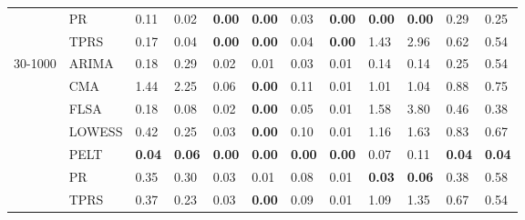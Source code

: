 \begin{table}[ht]
\begin{tabular}{llllllllllll}
   & PR & 0.11 & 0.02 & \textbf{0.00} & \textbf{0.00} & 0.03 & \textbf{0.00} & \textbf{0.00} & \textbf{0.00} & 0.29 & 0.25 \\ 
   & TPRS & 0.17 & 0.04 & \textbf{0.00} & \textbf{0.00} & 0.04 & \textbf{0.00} & 1.43 & 2.96 & 0.62 & 0.54 \\ 
  30-1000 & ARIMA & 0.18 & 0.29 & 0.02 & 0.01 & 0.03 & 0.01 & 0.14 & 0.14 & 0.25 & 0.54 \\ 
   & CMA & 1.44 & 2.25 & 0.06 & \textbf{0.00} & 0.11 & 0.01 & 1.01 & 1.04 & 0.88 & 0.75 \\ 
   & FLSA & 0.18 & 0.08 & 0.02 & \textbf{0.00} & 0.05 & 0.01 & 1.58 & 3.80 & 0.46 & 0.38 \\ 
   & LOWESS & 0.42 & 0.25 & 0.03 & \textbf{0.00} & 0.10 & 0.01 & 1.16 & 1.63 & 0.83 & 0.67 \\ 
   & PELT & \textbf{0.04} & \textbf{0.06} & \textbf{0.00} & \textbf{0.00} & \textbf{0.00} & \textbf{0.00} & 0.07 & 0.11 & \textbf{0.04} & \textbf{0.04} \\ 
   & PR & 0.35 & 0.30 & 0.03 & 0.01 & 0.08 & 0.01 & \textbf{0.03} & \textbf{0.06} & 0.38 & 0.58 \\ 
   & TPRS & 0.37 & 0.23 & 0.03 & \textbf{0.00} & 0.09 & 0.01 & 1.09 & 1.35 & 0.67 & 0.54 \\ 
   \bottomrule
\end{tabular}
\end{table}
